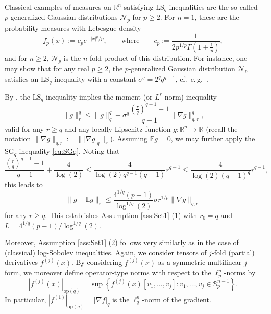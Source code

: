 \documentclass[a4paper,12pt]{amsart}
\numberwithin{equation}{section}
\theoremstyle{remark}
\def\E{{\mathbb E}}
\def\R{{\mathbb R}}
\def\S{{\mathbb S}}
\begin{document}
Classical examples of measures on $\R^n$ satisfying $\mathrm{LS}_q$-inequalities are the so-called $p$-generalized Gaussian distributions $\mathcal{N}_p$ for $p \ge 2$. For $n=1$, these are the probability measures with Lebesgue density
\[
f_p(x) := c_p e^{-|x|^p/p},\qquad \text{where}\qquad c_p := \frac{1}{2p^{1/p}\Gamma(1 + \frac{1}{p})},
\]
and for $n \ge 2$, $\mathcal{N}_p$ is the $n$-fold product of this distribution. For instance, one may show that for any real $p \ge 2$, the $p$-generalized Gaussian distribution $\mathcal{N}_p$ satisfies an $\mathrm{LS}_q$-inequality with a constant $\sigma^q = 2^qq^{q-1}$, cf.\ e.\,g.\ \cite[Prop.\ 3.1]{GS24}.

By \cite[Th.\ 6.1]{Bob10}, the $\mathrm{LS}_q$-inequality implies the moment (or $L^r$-norm) inequality
\begin{equation*}
	\lVert g \rVert_r^q \le \lVert g \rVert_q^q + \sigma^q \frac{(\frac{r}{q})^{q-1}-1}{q-1} \lVert \nabla g \rVert_{q,r}^q,
\end{equation*}
valid for any $r \ge q$ and any locally Lipschitz function $g \colon \R^n \to \R$ (recall the notation $\lVert \nabla g \rVert_{q,r} := \lVert \lvert \nabla g \rvert_q \rVert_r$). Assuming $\E g = 0$, we may further apply the $\mathrm{SG}_q$-inequality \eqref{eq:SGq}. Noting that
\[
\frac{(\frac{r}{q})^{q-1}-1}{q-1} + \frac{4}{\log(2)} \le \frac{4}{\log(2)q^{q-1}(q-1)}r^{q-1} \le \frac{4}{\log(2)(q-1)^q}r^{q-1},
\]
this leads to
\begin{equation}\label{eq:LSqLp}
	\lVert g - \E g \rVert_r \le \frac{4^{1/q}(p-1)}{\log^{1/q}(2)} \sigma r^{1/p} \lVert \nabla g \rVert_{q,r}
\end{equation}
for any $r \ge q$. This establishes Assumption \ref{ass:Set1} (1) with $r_0=q$ and $L = 4^{1/q}(p-1)/\log^{1/q}(2)$.

Moreover, Assumption \ref{ass:Set1} (2) follows very similarly as in the case of (classical) log-Sobolev inequalities. Again, we consider tensors of $j$-fold (partial) derivatives $f^{(j)}(x)$. By considering $f^{(j)}(x)$ as a symmetric multilinear $j$-form, we moreover define operator-type norms with respect to the $\ell_p^n$-norms by
\begin{equation}
	\label{eq:Operatornormq}
	|f^{(j)}(x)|_{\mathrm{op}(q)} = \sup \left\{ f^{(j)}(x)[v_1, \ldots, v_j] \colon v_1, \ldots, v_j \in \S_p^{n-1}\right\}.
\end{equation}
In particular, $|f^{(1)}|_{\mathrm{op}(q)} = |\nabla f|_q$ is the $\ell_q^n$-norm of the gradient.
\end{document}
